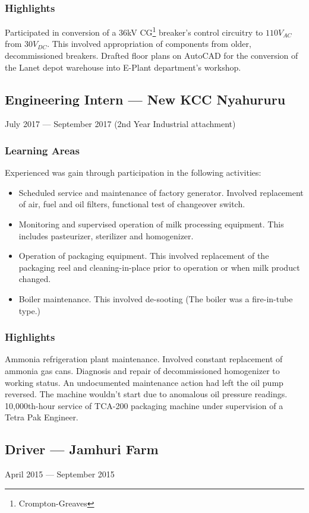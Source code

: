 \documentclass[a4paper]{article}
\begin{document}
\subsubsection{Highlights}
Participated in conversion of a 36kV CG\footnote{Crompton-Greaves} breaker's control circuitry to $110V_{AC}$ from $30V_{DC}$. This involved appropriation of components from older, decommissioned breakers.
Drafted floor plans on AutoCAD for the conversion of the Lanet depot warehouse into E-Plant department's workshop.

\subsection{Engineering Intern --- New KCC Nyahururu}
July 2017 --- September 2017 (2nd Year Industrial attachment)
\subsubsection{Learning Areas}
Experienced was gain through participation in the following activities:
\begin{itemize}
	\item Scheduled service and maintenance of factory generator. Involved replacement of air, fuel and oil filters, functional test of changeover switch.
	\item Monitoring and supervised operation of milk processing equipment. This includes pasteurizer, sterilizer and homogenizer.
	\item Operation of packaging equipment. This involved replacement of the packaging reel and cleaning-in-place prior to operation or when milk product changed.
	\item Boiler maintenance. This involved de-sooting (The boiler was a fire-in-tube type.)
\end{itemize}
\subsubsection{Highlights}
Ammonia refrigeration plant maintenance. Involved constant replacement of ammonia gas cans.
Diagnosis and repair of decommissioned homogenizer to working status. An undocumented maintenance action had left the oil pump reversed. The machine wouldn't start due to anomalous oil pressure readings.
10,000th-hour service of TCA-200 packaging machine under supervision of a Tetra Pak Engineer.

\subsection{Driver --- Jamhuri Farm}
April 2015 --- September 2015
\end{document}
